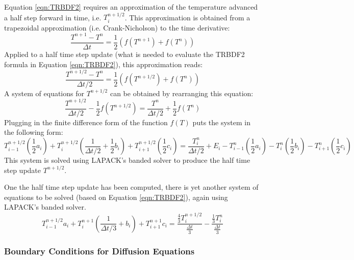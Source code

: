 \documentclass[11pt,letterpaper]{article}
\begin{document}
Equation \ref{eqn:TRBDF2} requires an approximation of the temperature advanced a half step forward in time, i.e. $T_i^{n+1/2}$.  This approximation is obtained from a trapezoidal approximation (i.e. Crank-Nicholson) to the time derivative:
\begin{equation}
\frac{T^{n+1} - T^n}{\Delta t} = \frac{1}{2} \left( f(T^{n+1}) + f(T^n) \right)
\end{equation}
Applied to a half time step update (what is needed to evaluate the TRBDF2 formula in Equation \ref{eqn:TRBDF2}), this approximation reads:
\begin{equation}
\frac{T^{n+1/2} - T^n}{\Delta t/2} = \frac{1}{2} \left( f(T^{n+1/2}) + f(T^n) \right)
\end{equation}
A system of equations for $T^{n+1/2}$ can be obtained by rearranging this equation:
\begin{equation}
\frac{T^{n+1/2}}{\Delta t/2} - \frac{1}{2} f(T^{n+1/2})= \frac{T^n}{\Delta t/2} + \frac{1}{2} f(T^n)
\end{equation}
Plugging in the finite difference form of the function $f(T)$ puts the system in the following form:
\begin{equation}
T^{n+1/2}_{i-1} \left( \frac{1}{2} a_i \right) + T^{n+1/2}_i \left( \frac{1}{\Delta t/2} + \frac{1}{2} b_i \right) + T^{n+1/2}_{i+1} \left( \frac{1}{2} c_i \right)  = \frac{T^n_i}{\Delta t/2} + E_i - T^{n}_{i-1} \left( \frac{1}{2} a_i \right) - T^{n}_i \left( \frac{1}{2} b_i \right) - T^{n}_{i+1} \left( \frac{1}{2} c_i \right) 
\end{equation}
This system is solved using LAPACK's banded solver to produce the half time step update $T^{n+1/2}$.

One the half time step update has been computed, there is yet another system of equations to be solved (based on Equation \ref{eqn:TRBDF2}), again using LAPACK's banded solver.   
\begin{equation}
T^{n+1/2}_{i-1} a_i + T^{n+1}_i \left( \frac{1}{\Delta t/3} + b_i \right) + T^{n+1}_{i+1} c_i = \frac{\frac{4}{3} T_i^{n+1/2}}{\frac{\Delta t}{3}} - \frac{\frac{1}{3} T_i^{n}}{\frac{\Delta t}{3}} \label{eqn:TRBDF2}
\end{equation}


\subsubsection{Boundary Conditions for Diffusion Equations}
\end{document}
